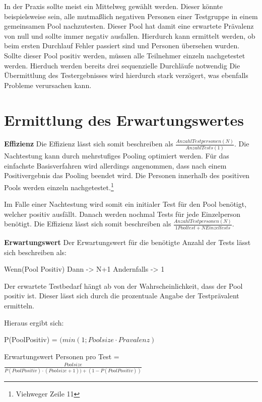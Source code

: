 In der Praxis sollte meist ein Mittelweg gewählt werden.
Dieser könnte beispielsweise sein, alle mutmaßlich negativen Personen einer Testgruppe in einem gemeinsamen Pool nachzutesten.
Dieser Pool hat damit eine erwartete Prävalenz von null und sollte immer negativ ausfallen.
Hierdurch kann ermittelt werden, ob beim ersten Durchlauf Fehler passiert sind und Personen übersehen wurden.
Sollte dieser Pool positiv werden, müssen alle Teilnehmer einzeln nachgetestet werden.
Hierduch werden bereits drei sequenzielle Durchläufe notwendig
Die Übermittlung des Testergebnisses wird hierdurch stark verzögert, was ebenfalls Probleme verursachen kann.

\section{Ermittlung des Erwartungswertes}
\textbf{Effizienz}\newline
Die Effizienz lässt sich somit beschreiben als $\frac{Anzahl Testpersonen (N)}{Anzahl Tests (1)} $.
Die Nachtestung kann durch mehrstufiges Pooling optimiert werden.
Für das einfachste Basisverfahren wird allerdings angenommen, dass nach einem Positivergebnis das Pooling beendet wird.
Die Personen innerhalb des positiven Pools werden einzeln nachgetestet.\footnote{Viehweger Zeile 11}

Im Falle einer Nachtestung wird somit ein initialer Test für den Pool benötigt, welcher positiv ausfällt.
Danach werden nochmal Tests für jede Einzelperson benötigt.
Die Effizienz lässt sich somit beschreiben als $\frac{Anzahl Testpersonen (N)}{1 Pooltest + N Einzeltests} $.

\textbf{Erwartungswert}\newline
Der Erwartungswert für die benötigte Anzahl der Tests lässt sich beschreiben als:

Wenn(Pool Positiv)
Dann -> N+1
Andernfalls -> 1

Der erwartete Testbedarf hängt ab von der Wahrscheinlichkeit, dass der Pool positiv ist.
Dieser lässt sich durch die prozentuale Angabe der Testprävalent ermitteln.

Hieraus ergibt sich:

P(PoolPositiv) = $(min\left(1;Poolsize\cdot Pravalenz\right)$

Erwartungswert Personen pro Test =
$\frac{Poolsize}{P(PoolPositiv)\cdot (Poolsize + 1)) + (1 - P(PoolPositiv))}$

